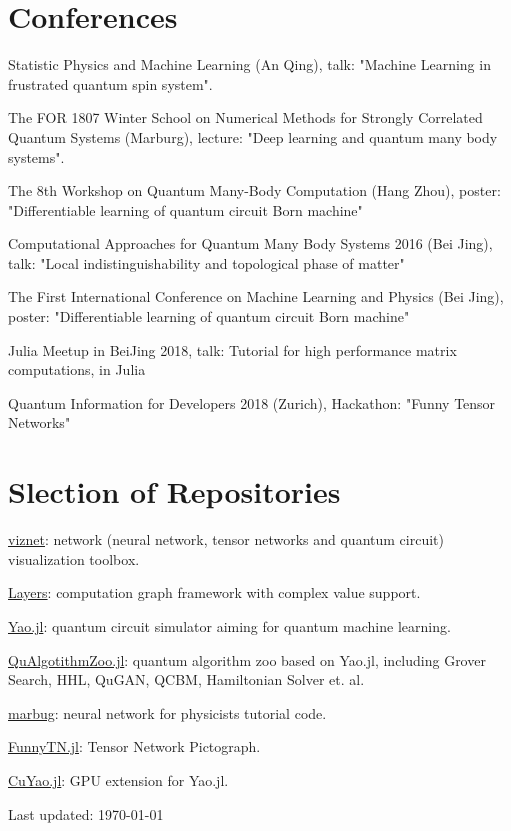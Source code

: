 \documentclass[letterpaper]{article}
\def\footerlink{}   %
\renewenvironment{itemize}{
  \begin{list}{}{
    \setlength{\leftmargin}{1.5em}
  }
}{
  \end{list}
}
\begin{document}
\section*{Conferences}
\begin{itemize}
    \item [1] Statistic Physics and Machine Learning (An Qing), talk: "Machine Learning in frustrated quantum spin system".
    \item [2] The FOR 1807 Winter School on Numerical Methods for Strongly Correlated Quantum Systems (Marburg), lecture: "Deep learning and quantum many body systems".
    \item [3] The 8th Workshop on Quantum Many-Body Computation (Hang Zhou), poster: "Differentiable learning of quantum circuit Born machine"
    \item [4] Computational Approaches for Quantum Many Body Systems 2016 (Bei Jing), talk: "Local indistinguishability and topological phase of matter"
    \item [5] The First International Conference on Machine Learning and Physics (Bei Jing), poster: "Differentiable learning of quantum circuit Born machine"
    \item [6] Julia Meetup in BeiJing 2018, talk: Tutorial for high performance matrix computations, in Julia
    \item [7] Quantum Information for Developers 2018 (Zurich), Hackathon: "Funny Tensor Networks"
\end{itemize}

\section*{Slection of Repositories}
\begin{itemize}
    \item \href{https://github.com/GiggleLiu/viznet}{viznet}: network (neural network, tensor networks and quantum circuit) visualization toolbox.
    \item \href{https://github.com/GiggleLiu/poorman\_nn}{Layers}: computation graph framework with complex value support.
    \item \href{https://github.com/QuantumBFS/Yao.jl}{Yao.jl}: quantum circuit simulator aiming for quantum machine learning.
    \item \href{https://github.com/QuantumBFS/QuAlgorithmZoo.jl}{QuAlgotithmZoo.jl}: quantum algorithm zoo based on Yao.jl, including Grover Search, HHL, QuGAN, QCBM, Hamiltonian Solver et. al.
    \item \href{https://github.com/GiggleLiu/marburg}{marbug}: neural network for physicists tutorial code.
    \item \href{https://travis-ci.com/QuantumBFS/FunnyTN.jl}{FunnyTN.jl}: Tensor Network Pictograph.
    \item \href{https://travis-ci.com/QuantumBFS/CuYao.jl}{CuYao.jl}: GPU extension for Yao.jl.
\end{itemize}

\bigskip

\begin{center}
  \begin{footnotesize}
    Last updated: \today \\
    \href{\footerlink}{\texttt{\footerlink}}
  \end{footnotesize}
\end{center}
\end{document}

